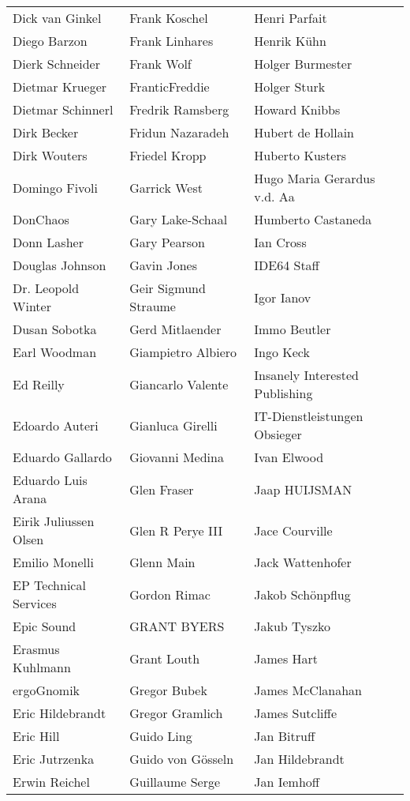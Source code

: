 \begin{tabular}{p{4.5cm}p{4.5cm}p{4.5cm}}
Dick van Ginkel & Frank Koschel & Henri Parfait \\
Diego Barzon & Frank Linhares & Henrik Kühn \\
Dierk Schneider & Frank Wolf & Holger Burmester \\
Dietmar Krueger & FranticFreddie & Holger Sturk \\
Dietmar Schinnerl & Fredrik Ramsberg & Howard Knibbs \\
Dirk Becker & Fridun Nazaradeh & Hubert de Hollain \\
Dirk Wouters & Friedel Kropp & Huberto Kusters \\
Domingo Fivoli & Garrick West & Hugo Maria Gerardus v.d. Aa \\
DonChaos & Gary Lake-Schaal & Humberto Castaneda \\
Donn Lasher & Gary Pearson & Ian Cross \\
Douglas Johnson & Gavin Jones & IDE64 Staff \\
Dr. Leopold Winter & Geir Sigmund Straume & Igor Ianov \\
Dusan Sobotka & Gerd Mitlaender & Immo Beutler \\
Earl Woodman & Giampietro Albiero & Ingo Keck \\
Ed Reilly & Giancarlo Valente & Insanely Interested Publishing \\
Edoardo Auteri & Gianluca Girelli & IT-Dienstleistungen Obsieger \\
Eduardo Gallardo & Giovanni Medina & Ivan Elwood \\
Eduardo Luis Arana & Glen Fraser & Jaap HUIJSMAN \\
Eirik Juliussen Olsen & Glen R Perye III & Jace Courville \\
Emilio Monelli & Glenn Main & Jack Wattenhofer \\
EP Technical Services & Gordon Rimac & Jakob Schönpflug \\
Epic Sound & GRANT BYERS & Jakub Tyszko \\
Erasmus Kuhlmann & Grant Louth & James Hart \\
ergoGnomik & Gregor Bubek & James McClanahan \\
Eric Hildebrandt & Gregor Gramlich & James Sutcliffe \\
Eric Hill & Guido Ling & Jan Bitruff \\
Eric Jutrzenka & Guido von Gösseln & Jan Hildebrandt \\
Erwin Reichel & Guillaume Serge & Jan Iemhoff \\

\end{tabular}
